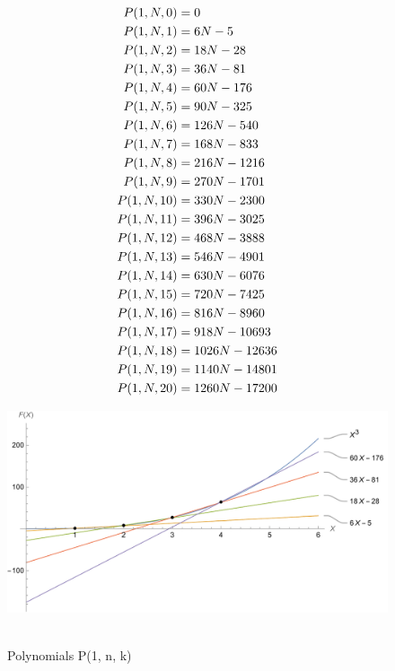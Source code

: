 ﻿\begin{align*}
    {P}(1,N,0) &= 0 \\
    {P}(1,N,1) &= 6N - 5 \\
    {P}(1,N,2) &= 18N - 28 \\
    {P}(1,N,3) &= 36N - 81 \\
    {P}(1,N,4) &= 60N - 176 \\
    {P}(1,N,5) &= 90N - 325 \\
    {P}(1,N,6) &= 126N - 540 \\
    {P}(1,N,7) &= 168N - 833 \\
    {P}(1,N,8) &= 216N - 1216 \\
    {P}(1,N,9) &= 270N - 1701 \\
    {P}(1,N,10) &= 330N - 2300 \\
    {P}(1,N,11) &= 396N - 3025 \\
    {P}(1,N,12) &= 468N - 3888 \\
    {P}(1,N,13) &= 546N - 4901 \\
    {P}(1,N,14) &= 630N - 6076 \\
    {P}(1,N,15) &= 720N - 7425 \\
    {P}(1,N,16) &= 816N - 8960 \\
    {P}(1,N,17) &= 918N - 10693 \\
    {P}(1,N,18) &= 1026N - 12636 \\
    {P}(1,N,19) &= 1140N - 14801 \\
    {P}(1,N,20) &= 1260N - 17200
\end{align*}
\begin{figure}[H]
    \centering
    \includegraphics[width=1\textwidth]{sections/images/01_cubes_with_p_1_n_k}
    ~\caption{Polynomials P(1, n, k)}\label{fig:figure}
\end{figure}
